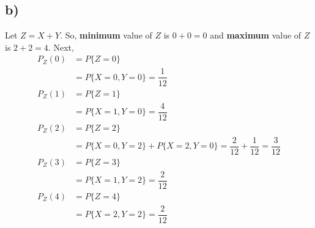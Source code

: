 \documentclass[12pt]{article}
\begin{document}
\subsection*{b)}
Let $Z = X + Y$. So, \textbf{minimum} value of $Z$ is $0 + 0 =0$ and \textbf{maximum} value of $Z$ is $2+2 = 4$. Next, \\
\begin{equation}
    \begin{split}
        P_Z (0) &= P\{Z = 0\} \\ 
                &= P\{X = 0, Y = 0\} = \dfrac{1}{12}\\
        P_Z (1) &= P\{Z = 1\} \\
                &= P\{X = 1, Y = 0\} = \dfrac{4}{12}\\
        P_Z (2) &= P\{Z = 2\} \\
                &= P\{X = 0, Y = 2\} + P\{X = 2, Y = 0\} = \dfrac{2}{12} + \dfrac{1}{12} = \dfrac{3}{12}\\
        P_Z (3) &= P\{Z = 3\}\\
                &= P\{X = 1, Y = 2\} = \dfrac{2}{12}\\
        P_Z (4) &= P\{Z = 4\}\\
                &= P\{X = 2, Y = 2\} = \dfrac{2}{12}
    \end{split}
\end{equation}
\end{document}
